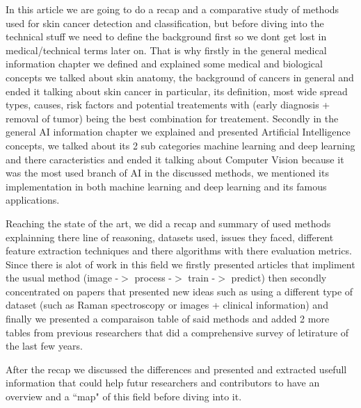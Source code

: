 In this article we are going to do a recap and a comparative study of methods used for skin cancer detection and classification, but before diving into the technical stuff we need to define the background first so we dont get lost in medical/technical terms later on. That is why firstly in the general medical information chapter we defined and explained some medical and biological concepts we talked about skin anatomy, the background of cancers in general and ended it talking about skin cancer in particular, its definition, most wide spread types, causes, risk factors and potential treatements with (early diagnosis + removal of tumor) being the best combination for treatement. Secondly in the general AI information chapter we explained and presented Artificial Intelligence concepts, we talked about its 2 sub categories machine learning and deep learning and there caracteristics and ended it talking about Computer Vision because it was the most used branch of AI in the discussed methods, we mentioned its implementation in both machine learning and deep learning and its famous applications.

Reaching the state of the art, we did a recap and summary of used methods explainning there line of reasoning, datasets used, issues they faced, different feature extraction techniques and there algorithms with there evaluation metrics. Since there is alot of work in this field we firstly presented articles that impliment the usual method (image -$>$ process -$>$ train -$>$ predict) then secondly concentrated on papers that presented new ideas such as using a different type of dataset (such as Raman spectroscopy or images + clinical information) and finally we presented a comparaison table of said methods and added 2 more tables from previous researchers that did a comprehensive survey of letirature of the last few years.

After the recap we discussed the differences and presented and extracted usefull information that could help futur researchers and contributors to have an overview and a ``map" of this field before diving into it. 
